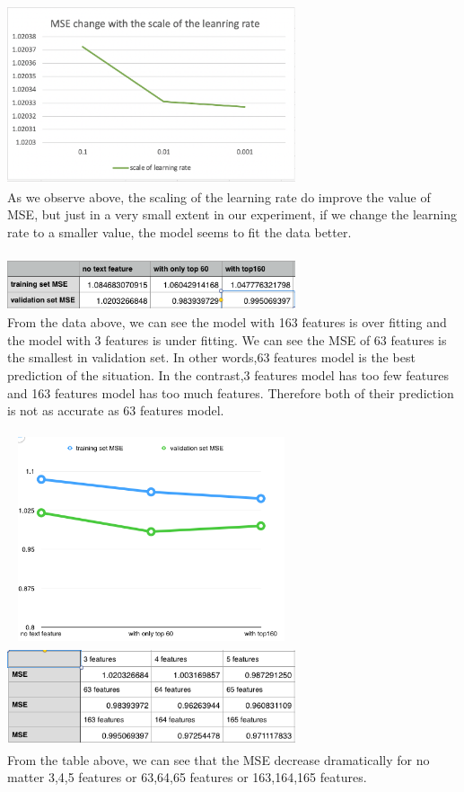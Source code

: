 \documentclass[11pt]{article}
\begin{document}
\\
\includegraphics[width=8.5cm, height=5.3cm]{learnrate.png}
\\
As we observe above, the scaling of the learning rate do improve the value of MSE, but just in a very small extent in our experiment, if we change the learning rate to a smaller value, the model seems to fit the data better.\\
\\
\includegraphics[width=8.5cm, height=1.5cm]{MSE.png}
\\
From the data above, we can see the model with 163 features is over fitting and the model with 3 features is under fitting. We can see the MSE of 63 features is the smallest in validation set. In other words,63 features model is the best prediction of the situation. In the contrast,3 features model has too few features and 163 features model has too much features. Therefore both of their prediction is not as accurate as 63 features model.\\
\\
\includegraphics[width=8.5cm, height=6cm]{Graph.png}
\includegraphics[width=8.5cm, height=3cm]{G.png}
\\
From the table above, we can see that the MSE decrease dramatically for no matter 3,4,5 features or 63,64,65 features or 163,164,165 features.\\
\\
\end{document}

